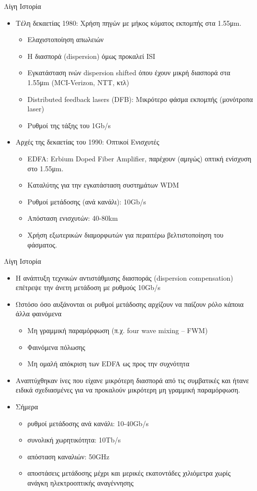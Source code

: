 \documentclass[11pt,aspectratio=169]{beamer}
\begin{document}
\begin{frame}[shrink=20,t]{Λίγη Ιστορία}
\begin{itemize}
\item Τέλη δεκαετίας 1980: Χρήση πηγών με μήκος κύματος εκπομπής στα 1.55μm.
\begin{itemize}
\item Ελαχιστοποίηση απωλειών
\item Η διασπορά (dispersion) όμως προκαλεί ISI
\item Εγκατάσταση ινών dispersion shifted όπου έχουν μικρή διασπορά στα 1.55μm (MCI-Verizon, NTT, κτλ)
\item Distributed feedback lasers (DFB): Μικρότερο φάσμα εκπομπής (μονότροπα laser)
\item Ρυθμοί της τάξης του 1Gb/s
\end{itemize}
\item Αρχές της δεκαετίας του 1990: Οπτικοί Ενισχυτές
\begin{itemize}
\item EDFA: Erbium Doped Fiber Amplifier, παρέχουν (αμιγώς) οπτική ενίσχυση στο 1.55μm.
\item Καταλύτης για την εγκατάσταση συστημάτων WDM
\item Ρυθμοί μετάδοσης (ανά κανάλι): 10Gb/s
\item Απόσταση ενισχυτών: 40-80km
\item Χρήση εξωτερικών διαμορφωτών για περαιτέρω βελτιστοποίηση του φάσματος.
\end{itemize}
\end{itemize}
\end{frame}

\begin{frame}[shrink=10,t]{Λίγη Ιστορία}
\begin{itemize}
\item H ανάπτυξη τεχνικών αντιστάθμισης διασποράς (dispersion compensation) επέτρεψε την άνετη μετάδοση με ρυθμούς 10Gb/s
\item Ωστόσο όσο αυξάνονται οι ρυθμοί μετάδοσης αρχίζουν να παίζουν ρόλο κάποια άλλα φαινόμενα
\begin{itemize}
\item Μη γραμμική παραμόρφωση (π.χ. four wave mixing – FWM)
\item Φαινόμενα πόλωσης
\item Μη ομαλή απόκριση των EDFA ως προς την συχνότητα
\end{itemize}
\item Αναπτύχθηκαν ίνες που είχανε μικρότερη διασπορά από τις συμβατικές και ήτανε ειδικά σχεδιασμένες για να προκαλούν μικρότερη μη γραμμική παραμόρφωση.
\item Σήμερα
\begin{itemize}
\item ρυθμοί μετάδοσης ανά κανάλι: 10-40Gb/s
\item συνολική χωρητικότητα: 10Τb/s
\item απόσταση καναλιών: 50GHz
\item αποστάσεις μετάδοσης μέχρι και μερικές εκατοντάδες χιλιόμετρα χωρίς ανάγκη ηλεκτροοπτικής αναγέννησης
\end{itemize}
\end{itemize}
\end{frame}
\end{document}
